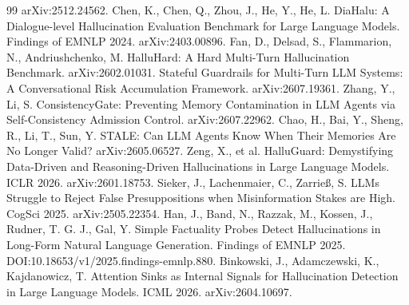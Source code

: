 \documentclass[10pt]{article}
\begin{document}
\begin{thebibliography}{99}
arXiv:2512.24562.
 Chen, K., Chen, Q., Zhou, J., He, Y.,
He, L. DiaHalu: A Dialogue-level Hallucination Evaluation Benchmark for
Large Language Models. Findings of EMNLP 2024. arXiv:2403.00896.
 Fan, D., Delsad, S., Flammarion, N.,
Andriushchenko, M. HalluHard: A Hard Multi-Turn Hallucination Benchmark.
arXiv:2602.01031.
 Stateful Guardrails
for Multi-Turn LLM Systems: A Conversational Risk Accumulation Framework.
arXiv:2607.19361.
 Zhang, Y., Li, S.
ConsistencyGate: Preventing Memory Contamination in LLM Agents via
Self-Consistency Admission Control. arXiv:2607.22962.
 Chao, H., Bai, Y., Sheng, R., Li, T.,
Sun, Y. STALE: Can LLM Agents Know When Their Memories Are No Longer
Valid? arXiv:2605.06527.
 Zeng, X., et al. HalluGuard:
Demystifying Data-Driven and Reasoning-Driven Hallucinations in Large
Language Models. ICLR 2026. arXiv:2601.18753.
 Sieker, J., Lachenmaier, C.,
Zarrie{\ss}, S. LLMs Struggle to Reject False Presuppositions when
Misinformation Stakes are High. CogSci 2025. arXiv:2505.22354.
 Han, J., Band, N., Razzak, M., Kossen,
J., Rudner, T. G. J., Gal, Y. Simple Factuality Probes Detect Hallucinations
in Long-Form Natural Language Generation. Findings of EMNLP 2025.
DOI:10.18653/v1/2025.findings-emnlp.880.
 Binkowski, J., Adamczewski,
K., Kajdanowicz, T. Attention Sinks as Internal Signals for Hallucination
Detection in Large Language Models. ICML 2026. arXiv:2604.10697.
\end{thebibliography}
\end{document}
